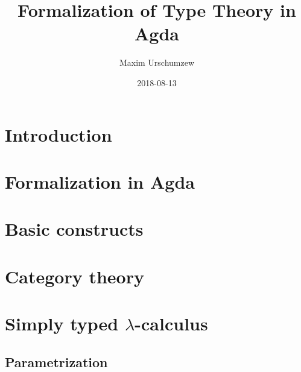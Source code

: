 \documentclass[
fontsize=11pt,
twoside
]{scrreprt}
\title{Formalization of Type Theory in Agda}
\author{Maxim Urschumzew}
\date{2018-08-13}
\begin{document}
%
%
\setlength\abovedisplayskip{6pt}
\setlength\belowdisplayskip{6pt}
%

%






\tableofcontents


\chapter{Introduction}


\chapter{Formalization in Agda}


\chapter{Basic constructs}





\chapter{Category theory}





\chapter{Simply typed $λ$-calculus}

\section{Parametrization}

\end{document}
